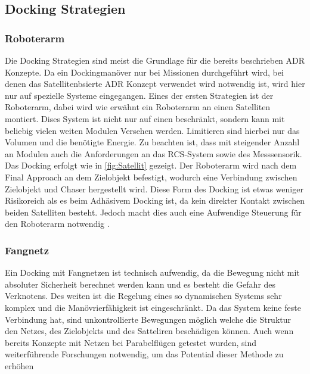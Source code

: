 		\subsection{Docking Strategien}

\subsubsection{Roboterarm}

	Die Docking Strategien sind meist die Grundlage für die bereits beschrieben ADR Konzepte.	Da ein Dockingmanöver nur bei  Missionen durchgeführt wird, bei denen das Satellitenbsierte ADR Konzept verwendet wird notwendig ist, wird hier nur auf spezielle Systeme eingegangen. Eines der ersten Strategien ist der Roboterarm, dabei wird wie erwähnt ein Roboterarm an einen Satelliten montiert. Dises System ist nicht nur auf einen beschränkt, sondern kann mit beliebig vielen weiten Modulen Versehen werden. Limitieren sind hierbei nur das Volumen und die benötigte Energie. Zu beachten ist, dass mit steigender Anzahl an Modulen auch die Anforderungen an das RCS-System sowie des Messsensorik. Das Docking erfolgt wie in \ref{fig:Satellit} gezeigt. Der Roboterarm wird nach dem Final Approach an dem Zielobjekt befestigt, wodurch eine Verbindung zwischen Zielobjekt und Chaser hergestellt wird. Diese Form des Docking ist etwas weniger Risikoreich als es beim Adhäsivem Docking ist, da kein direkter Kontakt zwischen beiden Satelliten besteht. Jedoch macht dies auch eine Aufwendige Steuerung für den Roboterarm notwendig \cite{Castronuovo.2011}.\newline

\subsubsection{Fangnetz}

	Ein Docking mit Fangnetzen ist technisch aufwendig, da die Bewegung nicht mit absoluter Sicherheit berechnet werden kann und es besteht die Gefahr des Verknotens. Des weiten ist die Regelung eines so dynamischen Systems sehr komplex und die Manövrierfähigkeit ist eingeschränkt. Da das System keine feste Verbindung hat, sind unkontrollierte Bewegungen möglich welche die Struktur den Netzes, des Zielobjekts und des Satteliren beschädigen können. Auch wenn bereits Konzepte mit Netzen bei Parabelflügen getestet wurden, sind weiterführende  Forschungen notwendig, um das Potential dieser Methode zu erhöhen
\newline

